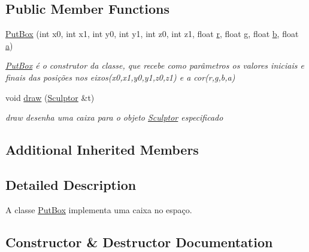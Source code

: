 \subsection*{Public Member Functions}
\begin{DoxyCompactItemize}
\item 
\hyperlink{class_put_box_a0cb7487b6058969a8a015842cf3257de}{Put\+Box} (int x0, int x1, int y0, int y1, int z0, int z1, float \hyperlink{class_figura_geometrica_a0a4f57efb1a6c525c8aeee34c92e7eab}{r}, float \hyperlink{class_figura_geometrica_a51930549bcb90d016b824f10f95df355}{g}, float \hyperlink{class_figura_geometrica_a25e5d6c21410103c25ec55c0117dac0d}{b}, float \hyperlink{class_figura_geometrica_ae7c8a027fcec3c357265b90458a4d165}{a})
\begin{DoxyCompactList}\small\item\em \hyperlink{class_put_box}{Put\+Box} é o construtor da classe, que recebe como parâmetros os valores iniciais e finais das posições nos eixos(x0,x1,y0,y1,z0,z1) e a cor(r,g,b,a) \end{DoxyCompactList}\item 
void \hyperlink{class_put_box_a3caaf01d035f5a0749fd308e9a86de94}{draw} (\hyperlink{class_sculptor}{Sculptor} \&t)
\begin{DoxyCompactList}\small\item\em draw desenha uma caixa para o objeto \hyperlink{class_sculptor}{Sculptor} especificado \end{DoxyCompactList}\end{DoxyCompactItemize}
\subsection*{Additional Inherited Members}


\subsection{Detailed Description}
A classe \hyperlink{class_put_box}{Put\+Box} implementa uma caixa no espaço. 

\subsection{Constructor \& Destructor Documentation}
\mbox{\label{class_put_box_a0cb7487b6058969a8a015842cf3257de}} 
